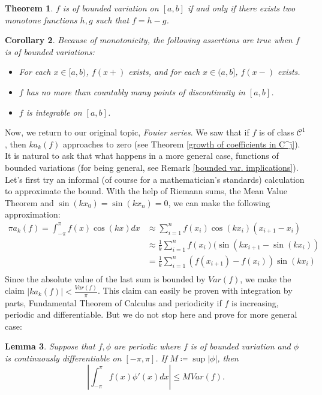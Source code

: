 \documentclass[12pt]{amsart}
\newtheorem{theorem}{Theorem}[section]
\newtheorem{corollary}[theorem]{Corollary}
\newtheorem{lemma}[theorem]{Lemma}
\theoremstyle{definition}
\newcommand{\cC}{{\mathcal C}}
\begin{document}
\begin{theorem}
     $f$ is of bounded variation on $[a,b]$ if and only if there exists two monotone functions $h,g$ such that $f = h - g$.
\end{theorem}


\begin{corollary}\label{facts on bounded var.}
    Because of monotonicity, the following assertions are true when $f$ is of bounded variations:
    \begin{itemize}
        \item[(a)] For each \(x \in [a, b)\), \(f(x+)\) exists, and for each \(x \in (a, b]\), \(f(x-)\) exists.
        \item[(b)] $f$ has no more than countably many points of discontinuity in $[a,b]$.
        \item[(c)] $f$ is integrable on $[a,b]$.
    \end{itemize}
\end{corollary}


Now, we return to our original topic, \emph{Fouier series}. We saw that if $f$ is of class $\cC^1$, then $ka_k(f)$ approaches to zero (see Theorem \ref{growth of coefficients in C^j}). It is natural to ask that what happens in a more general case, functions of bounded variations (for being general, see Remark \ref{bounded var. implications}). Let's first try an informal (of course for a mathematician's standards) calculation to approximate the bound. With the help of Riemann sums, the Mean Value Theorem and $\sin(kx_0) = \sin(kx_n) = 0$, we can make the following approximation:
\[
\begin{aligned}
    \pi a_k(f) = \int_{-\pi}^{\pi}f(x) \cos(kx) dx &\approx \sum_{i = 1}^{n}f(x_i)\cos(kx_i)(x_{i+1} - x_i)\\
    &\approx \frac{1}{k} \sum_{i = 1}^{n}f(x_i)(\sin(kx_{i+1} - \sin(kx_i))\\
    &= \frac{1}{k} \sum_{i = 1}^{n}(f(x_{i+1}) - f(x_i)) \sin(kx_i)\\
\end{aligned}
\]
Since the absolute value of the last sum is bounded by $Var(f)$, we make the claim $|ka_k(f)| < \frac{Var(f)}{\pi}$. This claim can easily be proven with integration by parts, Fundamental Theorem of Calculus and periodicity if $f$ is increasing, periodic and differentiable. But we do not stop here and prove for more general case:


\begin{lemma}\label{bounded var. coefficient grow}
    Suppose that $f,\phi$ are periodic where $f$ is of bounded variation and $\phi$ is continuously differentiable on $[-\pi,\pi]$. If $M \coloneqq \sup{|\phi|}$, then
    \begin{equation}
        \left|\int_{-\pi}^{\pi}f(x)\phi'(x)dx\right| \leq M Var(f).
    \end{equation}
\end{lemma}
\end{document}
